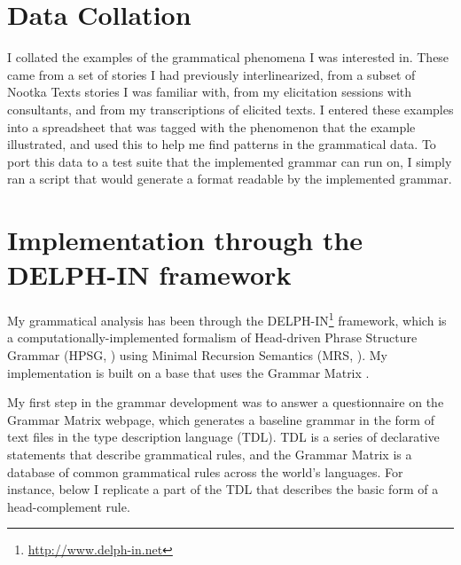 
\section{Data Collation} \label{ch:method:collation}

I collated the examples of the grammatical phenomena I was interested in. These came from a set of stories I had previously interlinearized, from a subset of Nootka Texts stories I was familiar with, from my elicitation sessions with consultants, and from my transcriptions of elicited texts. I entered these examples into a spreadsheet that was tagged with the phenomenon that the example illustrated, and used this to help me find patterns in the grammatical data. To port this data to a test suite that the implemented grammar can run on, I simply ran a script that would generate a format readable by the implemented grammar.

\section{Implementation through the DELPH-IN framework} \label{ch:method:delphin}

My grammatical analysis has been through the DELPH-IN\footnote{\url{http://www.delph-in.net}} framework, which is a computationally-implemented formalism of Head-driven Phrase Structure Grammar (HPSG, \citealt{pollardsag1994}) using Minimal Recursion Semantics (MRS, \citealt{copestake2005}). My implementation is built on a base that uses the Grammar Matrix \citep{bender2002, flickinger2003, benderetal2010}.

My first step in the grammar development was to answer a questionnaire on the Grammar Matrix webpage, which generates a baseline grammar in the form of text files in the type description language (TDL). TDL is a series of declarative statements that describe grammatical rules, and the Grammar Matrix is a database of common grammatical rules across the world's languages. For instance, below I replicate a part of the TDL that describes the basic form of a head-complement rule.

